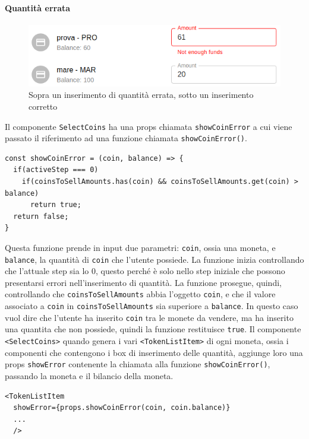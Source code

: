 \documentclass[a4paper]{article}
\begin{document}
        \paragraph{Quantità errata}
        \label{quantityerror}
        \begin{figure}[ht]
          \includegraphics[scale=0.5]{errorMessage.png}
          \centering
          \caption{Sopra un inserimento di quantità errata, sotto un inserimento corretto}
          \label{fig:errorMessage}
        \end{figure}
        Il componente \verb|SelectCoins| ha una props chiamata \verb|showCoinError| a cui viene passato il riferimento ad una funzione chiamata \verb|showCoinError()|.
        \begin{lstlisting}[style=ES6, title={Funzione showCoinError}]
const showCoinError = (coin, balance) => {
  if(activeStep === 0) 
    if(coinsToSellAmounts.has(coin) && coinsToSellAmounts.get(coin) > balance)
      return true;
  return false;
}\end{lstlisting}
        Questa funzione prende in input due parametri: \verb|coin|, ossia una moneta, e \verb|balance|, la quantità di \verb|coin| che l'utente possiede. La funzione inizia controllando che l'attuale step sia lo 0,
        questo perché è solo nello step iniziale che possono presentarsi errori nell'inserimento di quantità. La funzione prosegue, quindi, controllando che \verb|coinsToSellAmounts| abbia l'oggetto \verb|coin|, e che il valore associato a \verb|coin| in \verb|coinsToSellAmounts| sia superiore a \verb|balance|.
        In questo caso vuol dire che l'utente ha inserito \verb|coin| tra le monete da vendere, ma ha inserito una quantita che non possiede, quindi la funzione restituisce \verb|true|.
        \newline
        Il componente \verb|<SelectCoins>| quando genera i vari \verb|<TokenListItem>| di ogni moneta, ossia i componenti che contengono i box di inserimento delle quantità, aggiunge loro una props \verb|showError| contenente la chiamata alla funzione \verb|showCoinError()|,
        passando la moneta e il bilancio della moneta.
        \begin{lstlisting}[style=ES6, title={Funzione showCoinError}]
  <TokenListItem 
  showError={props.showCoinError(coin, coin.balance)}
  ... 
  />
\end{lstlisting}
\end{document}
